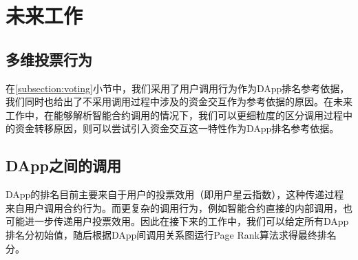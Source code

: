 \section{未来工作}
\subsection{多维投票行为}
在\ref{subsection:voting}小节中，我们采用了用户调用行为作为DApp排名参考依据，我们同时也给出了不采用调用过程中涉及的资金交互作为参考依据的原因。在未来工作中，在能够解析智能合约调用的情况下，我们可以更细粒度的区分调用过程中的资金转移原因，则可以尝试引入资金交互这一特性作为DApp排名参考依据。

\subsection{DApp之间的调用}
DApp的排名目前主要来自于用户的投票效用（即用户星云指数），这种传递过程来自用户调用合约行为。而更复杂的调用行为，例如智能合约直接的内部调用，也可能进一步传递用户投票效用。因此在接下来的工作中，我们可以给定所有DApp排名分初始值，随后根据DApp间调用关系图运行Page Rank算法\cite{page1999pagerank}求得最终排名分。


